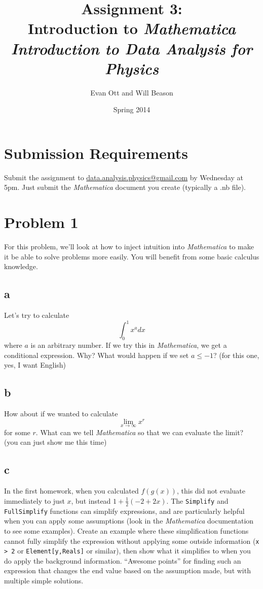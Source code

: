\documentclass{article}
\title{Assignment 3: \\ Introduction to \emph{Mathematica}\\
\large \emph{Introduction to Data Analysis for Physics}}
\author{Evan Ott and Will Beason}
\date{Spring 2014}
\begin{document}
\maketitle
\section{Submission Requirements}
Submit the assignment to \href{mailto:data.analysis.physics@gmail.com}{data.analysis.physics@gmail.com} by Wednesday at 5pm. Just submit the \emph{Mathematica}
document you create (typically a .nb file).

\section{Problem 1}
For this problem, we'll look at how to inject intuition into \emph{Mathematica} to make it be able to solve problems more easily. You will benefit from some basic calculus knowledge.

\subsection{a}
Let's try to calculate $$\int_0^1x^adx$$ where $a$ is an arbitrary number. If we try this in \emph{Mathematica}, we get a conditional expression. Why? What would happen if
we set $a\leq-1$? (for this one, yes, I want English)

\subsection{b}
How about if we wanted to calculate $$\lim_{x\rightarrow\infty}x^r$$ for some $r$. What can we tell \emph{Mathematica} so that we can evaluate the limit? (you can just show me this time)

\subsection{c}
In the first homework, when you calculated $f(g(x))$, this did not evaluate immediately to just $x$, but instead $1 + \frac{1}{2}(-2+2x)$. The \texttt{Simplify} and \texttt{FullSimplify}
functions can simplify expressions, and are particularly helpful when you can apply some assumptions (look in the \emph{Mathematica} documentation to see some
examples). Create an example where these simplification functions cannot fully simplify the expression without applying some outside information (\texttt{x > 2} or \texttt{Element[y,Reals]}
or similar), then show what it simplifies to when you do apply the background information. ``Awesome points'' for finding such an expression that changes the end value based on the
assumption made, but with multiple simple solutions.
\end{document}
